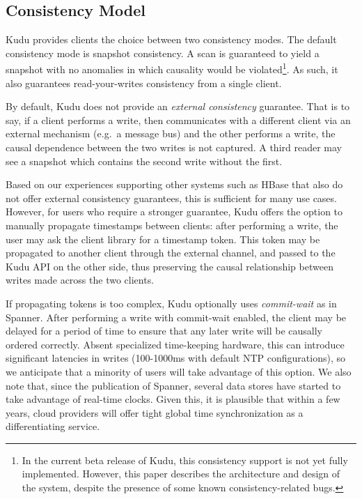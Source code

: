 \documentclass[twocolumn,9pt]{article}
\begin{document}
\subsection{Consistency Model}
Kudu provides clients the choice between two consistency modes. The default consistency mode is snapshot
consistency. A scan is guaranteed to yield a snapshot with no anomalies in which causality would be
violated\footnote{In the current beta release of Kudu, this consistency support is not yet fully implemented.
However, this paper describes the architecture and design of the system, despite the presence of
some known consistency-related bugs.}. As such, it also guarantees read-your-writes consistency from a single client.

By default, Kudu does not provide an {\em external consistency} guarantee. That is to say, if a client
performs a write, then communicates with a different client via an external mechanism (e.g.\ a message
bus) and the other performs a write, the causal dependence between the two writes is not captured.
A third reader may see a snapshot which contains the second write without the first.

Based on our experiences supporting other systems such as HBase that also do not offer external consistency
guarantees, this is sufficient for many use cases. However, for users who require a stronger
guarantee, Kudu offers the option to manually propagate timestamps between clients: after performing
a write, the user may ask the client library for a timestamp token. This token may be propagated to
another client through the external channel, and passed to the Kudu API on the other side, thus preserving
the causal relationship between writes made across the two clients.

If propagating tokens is too complex, Kudu optionally uses {\em commit-wait} as in Spanner\cite{spanner}. After
performing a write with commit-wait enabled, the client may be delayed for a period of time to
ensure that any later write will be causally ordered correctly. Absent specialized time-keeping
hardware, this can introduce significant latencies in writes (100-1000ms with default NTP configurations),
so we anticipate that a minority of users will take advantage of this option. We also note
that, since the publication of Spanner, several data stores have started to take advantage
of real-time clocks. Given this, it is plausible that within a few years, cloud providers
will offer tight global time synchronization as a
differentiating service.
\end{document}
